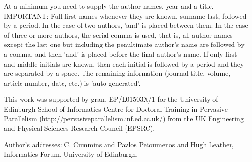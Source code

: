 \documentclass[prodmode,acmtecs]{acmsmall} %
\begin{document}
%
%



At a minimum you need to supply the author names, year and a title.
IMPORTANT:
Full first names whenever they are known, surname last, followed by a period.
In the case of two authors, 'and' is placed between them.
In the case of three or more authors, the serial comma is used, that is, all author names
except the last one but including the penultimate author's name are followed by a comma,
and then 'and' is placed before the final author's name.
If only first and middle initials are known, then each initial
is followed by a period and they are separated by a space.
The remaining information (journal title, volume, article number,
date, etc.) is 'auto-generated'.

\begin{bottomstuff}
  This work was supported by grant EP/L01503X/1 for the University of
  Edinburgh School of Informatics Centre for Doctoral Training in
  Pervasive Parallelism
  (\url{http://pervasiveparallelism.inf.ed.ac.uk/}) from the UK
  Engineering and Physical Sciences Research Council (EPSRC).

  Author's addresses: C. Cummins {and} Pavlos Petoumenos {and} Hugh
  Leather, Informatics Forum, University of Edinburgh.
\end{bottomstuff}
\end{document}
